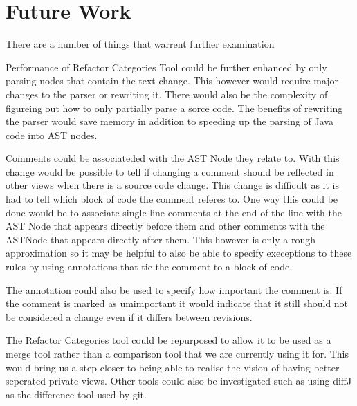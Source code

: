
\chapter{Future Work}

There are a number of things that warrent further examination 

Performance of Refactor Categories Tool could be further enhanced by only parsing nodes that contain the text change.  This however would require major changes to the parser or rewriting it. There would also be the complexity of figureing out how to only partially parse a sorce code. The benefits of rewriting the parser would save memory in addition to speeding up the parsing of Java code into AST nodes.


Comments could be associateded with the AST Node they relate to.  With this change would be possible to tell if changing a comment should be reflected in other views when there is a source code change. This change is difficult as it is had to tell which block of code the comment referes to.  One way this could be done would be to associate single-line comments at the end of the line with the AST Node that appears directly before them and other comments with the ASTNode that appears directly after them.  This however is only a rough approximation so it may be helpful to also be able to specify execeptions to these rules by using annotations that tie the comment to a block of code.

The annotation could also be used to specify how important the comment is. If the comment is marked as umimportant it would indicate that it still should not be considered a change even if it differs between revisions.

The Refactor Categories tool could be repurposed to allow it to be used as a merge tool rather than a comparison tool that we are currently using it for.  This would bring us a step closer to being able to realise the vision of having better seperated private views.  Other tools could also be investigated such as using diffJ as the difference tool used by git.
% 
% 
% 
% 







